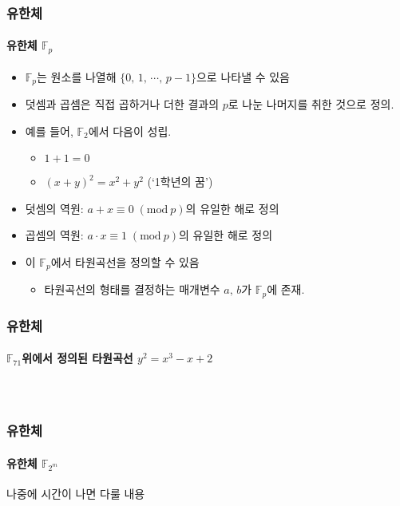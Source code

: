 \documentclass[aspectratio=169,mathserif]{beamer}
\newcommand{\Fp}{\mathbb{F}_p}
\newcommand{\Ftwom}{\mathbb{F}_{2^m}}
\begin{document}
  \begin{frame}
    \frametitle{유한체}
    \framesubtitle{유한체 \(\Fp\)}

    \begin{itemize}
      \item \(\Fp\)는 원소를 나열해 \(\{0,\,1,\,\cdots,\,p-1\}\)으로 나타낼 수 있음
      \item 덧셈과 곱셈은 직접 곱하거나 더한 결과의 \(p\)로 나눈 나머지를 취한 것으로 정의.
      \pause
      \item 예를 들어, \(\mathbb{F}_2\)에서 다음이 성립.
      \begin{itemize}
        \item \(1+1=0\)
        \item \((x+y)^2=x^2+y^2\) (`1학년의 꿈')
      \end{itemize}
      \pause
      \item 덧셈의 역원: \(a+x\equiv 0\;(\mathrm{mod}\:p)\)의 유일한 해로 정의
      \item 곱셈의 역원: \(a\cdot x\equiv 1\;(\mathrm{mod}\:p)\)의 유일한 해로 정의
      \pause
      \item 이 \(\Fp\)에서 타원곡선을 정의할 수 있음
      \begin{itemize}
        \item 타원곡선의 형태를 결정하는 매개변수 \(a,\,b\)가 \(\Fp\)에 존재.
      \end{itemize}
    \end{itemize}
  \end{frame}

  \begin{frame}
    \frametitle{유한체}
    \framesubtitle{\(\mathbb{F}_{71}\)위에서 정의된 타원곡선 \(y^2 = x^3 - x + 2\)}

    \begin{columns}
      \begin{figure}
        \raggedleft
        \scalebox{0.5}{}
      \end{figure}
      \pause
      \begin{figure}
        \scalebox{0.5}{}
      \end{figure}
    \end{columns}
  \end{frame}

  \begin{frame}
    \frametitle{유한체}
    \framesubtitle{유한체 \(\Ftwom\)}

    나중에 시간이 나면 다룰 내용
  \end{frame}
\end{document}
